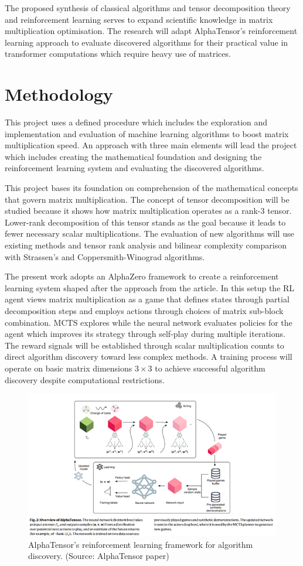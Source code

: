 \documentclass{article}
\begin{document}
The proposed synthesis of classical algorithms and tensor decomposition theory and reinforcement learning serves to expand scientific knowledge in matrix multiplication optimisation. The research will adapt AlphaTensor's reinforcement learning approach to evaluate discovered algorithms for their practical value in transformer computations which require heavy use of matrices.

\section{Methodology}
This project uses a defined procedure which includes the exploration and implementation and evaluation of machine learning algorithms to boost matrix multiplication speed. An approach with three main elements will lead the project which includes creating the mathematical foundation and designing the reinforcement learning system and evaluating the discovered algorithms. 

This project bases its foundation on comprehension of the mathematical concepts that govern matrix multiplication. The concept of tensor decomposition will be studied because it shows how matrix multiplication operates as a rank-3 tensor. Lower-rank decomposition of this tensor stands as the goal because it leads to fewer necessary scalar multiplications. The evaluation of new algorithms will use existing methods and tensor rank analysis and bilinear complexity comparison with Strassen's and Coppersmith-Winograd algorithms.

The present work adopts an AlphaZero framework to create a reinforcement learning system shaped after the approach from the article. In this setup the RL agent views matrix multiplication as a game that defines states through partial decomposition steps and employs actions through choices of matrix sub-block combination. MCTS explores while the neural network evaluates policies for the agent which improves its strategy through self-play during multiple iterations. The reward signals will be established through scalar multiplication counts to direct algorithm discovery toward less complex methods. A training process will operate on basic matrix dimensions \( 3 \times 3 \) to achieve successful algorithm discovery despite computational restrictions.

\begin{figure}[H]
    \centering
    \includegraphics[width=0.6\linewidth]{Picture2.png}
    \caption{AlphaTensor's reinforcement learning framework for algorithm discovery. (Source: AlphaTensor paper)}
    \label{fig:alphatensor-framework}
\end{figure}
\end{document}
